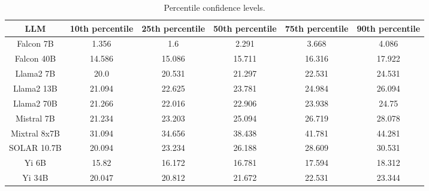 \begin{table*}
\centering
\begin{tabular}{c|c|c|c|c|c}
LLM & 10th percentile & 25th percentile & 50th percentile & 75th percentile & 90th percentile\\ \hline
Falcon 7B & 1.356 & 1.6 & 2.291 & 3.668 & 4.086\\
Falcon 40B & 14.586 & 15.086 & 15.711 & 16.316 & 17.922\\
Llama2 7B & 20.0 & 20.531 & 21.297 & 22.531 & 24.531\\
Llama2 13B & 21.094 & 22.625 & 23.781 & 24.984 & 26.094\\
Llama2 70B & 21.266 & 22.016 & 22.906 & 23.938 & 24.75\\
Mistral 7B & 21.234 & 23.203 & 25.094 & 26.719 & 28.078\\
Mixtral 8x7B & 31.094 & 34.656 & 38.438 & 41.781 & 44.281\\
SOLAR 10.7B & 20.094 & 23.234 & 26.188 & 28.609 & 30.531\\
Yi 6B & 15.82 & 16.172 & 16.781 & 17.594 & 18.312\\
Yi 34B & 20.047 & 20.812 & 21.672 & 22.531 & 23.344\\
\hline
\end{tabular}
\caption{Percentile confidence levels.}
\label{tab:percentile_conf}
\end{table*}
